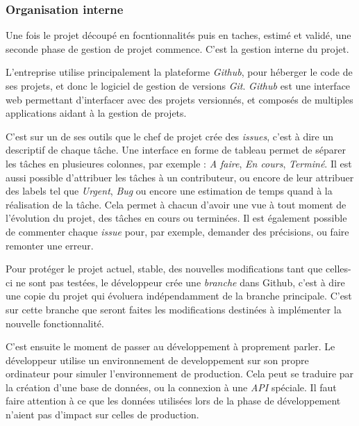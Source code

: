 \documentclass[12pt,a4paper]{article}
\begin{document}
  \bigskip

  \subsubsection{Organisation interne}\label{organisation-interne}

  \bigskip

  Une fois le projet découpé en focntionnalités puis en taches, estimé et
  validé, une seconde phase de gestion de projet commence. C'est la
  gestion interne du projet.

  L'entreprise utilise principalement la plateforme \emph{Github}, pour
  héberger le code de ses projets, et donc le logiciel de gestion de
  versions \emph{Git}. \emph{Github} est une interface web permettant
  d'interfacer avec des projets versionnés, et composés de multiples
  applications aidant à la gestion de projets.

  \bigskip

  C'est sur un de ses outils que le chef de projet crée des \emph{issues},
  c'est à dire un descriptif de chaque tâche. Une interface en forme de
  tableau permet de séparer les tâches en plusieures colonnes, par exemple
  : \emph{A faire}, \emph{En cours}, \emph{Terminé}. Il est aussi possible
  d'attribuer les tâches à un contributeur, ou encore de leur attribuer
  des labels tel que \emph{Urgent}, \emph{Bug} ou encore une estimation de
  temps quand à la réalisation de la tâche. Cela permet à chacun d'avoir
  une vue à tout moment de l'évolution du projet, des tâches en cours ou
  terminées. Il est également possible de commenter chaque \emph{issue}
  pour, par exemple, demander des précisions, ou faire remonter une
  erreur.

  \bigskip

  Pour protéger le projet actuel, stable, des nouvelles modifications tant
  que celles-ci ne sont pas testées, le développeur crée une
  \emph{branche} dans Github, c'est à dire une copie du projet qui
  évoluera indépendamment de la branche principale. C'est sur cette
  branche que seront faites les modifications destinées à implémenter la
  nouvelle fonctionnalité.

  \bigskip

  C'est ensuite le moment de passer au développement à proprement parler.
  Le développeur utilise un environnement de developpement sur son propre
  ordinateur pour simuler l'environnement de production. Cela peut se
  traduire par la création d'une base de données, ou la connexion à une
  \emph{API} spéciale. Il faut faire attention à ce que les données
  utilisées lors de la phase de développement n'aient pas d'impact sur
  celles de production.
\end{document}
